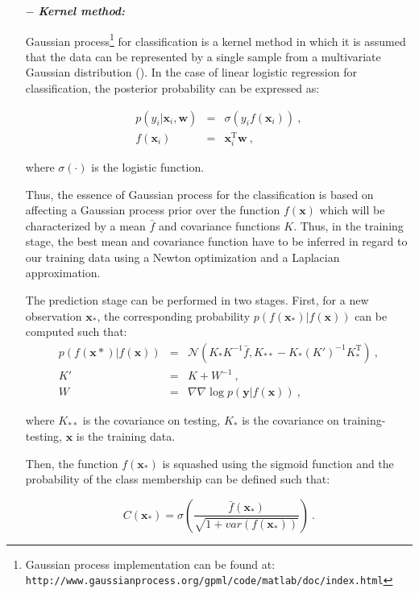 \begin{enumerate}[leftmargin=*]
\item[$-$] \textbf{\textit{Kernel method:}}

Gaussian process\footnote{Gaussian process implementation can be found at: \texttt{http://www.gaussianprocess.org/gpml/\allowbreak code/matlab/doc/index.html}} for classification is a kernel method in which it is assumed that the data can be represented by a single sample from a multivariate Gaussian distribution (\cite{Rasmussen2005}). In the case of linear logistic regression for classification, the posterior probability can be expressed as:

\begin{eqnarray}
	p(y_i|\mathbf{x}_i,\mathbf{w}) & = & \sigma(y_i f(\mathbf{x}_i)) \ , \label{eq:gp1} \\
	f(\mathbf{x}_i) & = & \mathbf{x}_i^{\text{T}} \mathbf{w} \ , \nonumber
\end{eqnarray}

\noindent where $\sigma(\cdot)$ is the logistic function.

Thus, the essence of Gaussian process for the classification is based on affecting a Gaussian process prior over the function $f(\mathbf{x})$ which will be characterized by a mean $\bar{f}$ and covariance functions $K$. Thus, in the training stage, the best mean and covariance function have to be inferred in regard to our training data using a Newton optimization and a Laplacian approximation.

The prediction stage can be performed in two stages. First, for a new observation $\mathbf{x}_*$, the corresponding probability $p(f(\mathbf{x}_*)|f(\mathbf{x}))$ can be computed such that:
\begin{eqnarray}
	p(f(\mathbf{x}*)|f(\mathbf{x})) & = & \mathcal{N}( K_*K^{-1}\bar{f}, K_{**}-K_*(K')^{-1}K_*^{\text{T}} ) \ , \nonumber \\
	K' & = & K + W^{-1} \ , \label{eq:gp2} \\
	W & = & \nabla \nabla \log p(\mathbf{y}|f(\mathbf{x})) \ , \nonumber
\end{eqnarray}

\noindent where $K_{**}$ is the covariance on testing, $K_{*}$ is the covariance on training-testing, $\mathbf{x}$ is the training data.

Then, the function $f(\mathbf{x}_*)$ is squashed using the sigmoid function and the probability of the class membership can be defined such that:

\begin{equation}
	C(\mathbf{x}_*) = \sigma\left( \frac{\bar{f}(\mathbf{x_*})}{\sqrt{1+var(f(\mathbf{x}_*))}} \right) \ .
	\label{eq:gp3}
\end{equation}


\end{enumerate}
